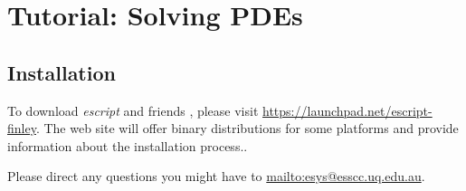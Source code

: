 
%
%
%


\chapter{Tutorial: Solving PDEs}
\label{CHAP: Tutorial}

\section{Installation}
\label{INSTALL}
To download {\it escript} and friends , please visit \url{https://launchpad.net/escript-finley}. 
The web site will offer binary distributions for some platforms and provide information about the installation process..

Please direct any questions you might have to \url{mailto:esys@esscc.uq.edu.au}.






% 
